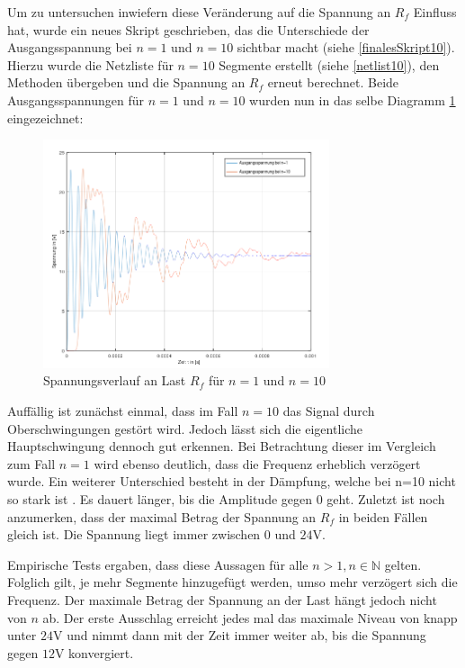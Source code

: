\newpage
Um zu untersuchen inwiefern diese Veränderung auf die Spannung an $R_f$ Einfluss hat, wurde ein neues Skript geschrieben, das die Unterschiede der Ausgangsspannung bei $n=1$ und $n=10$ sichtbar macht (siehe \ref{finalesSkript10}). Hierzu wurde die Netzliste für $n=10$ Segmente erstellt (siehe \ref{netlist10}), den Methoden übergeben und die Spannung an $R_f$ erneut berechnet.
Beide Ausgangsspannungen für $n=1$ und $n=10$ wurden nun in das selbe Diagramm \ref{plottKK10} eingezeichnet:

\begin{figure}[h]
	\centering
	\includegraphics[width=0.75\textwidth]{data/plotKK10}
	\caption{Spannungsverlauf an Last $R_f$ für $n=1$ und $n=10$}
	\label{plottKK10}
\end{figure}

Auffällig ist zunächst einmal, dass im Fall $n=10$ das Signal durch Oberschwingungen gestört wird. Jedoch lässt sich die eigentliche Hauptschwingung dennoch gut erkennen. Bei Betrachtung dieser im Vergleich zum Fall $n=1$ wird ebenso deutlich, dass die Frequenz erheblich verzögert wurde. Ein weiterer Unterschied besteht in der Dämpfung, welche bei n=10 nicht so stark ist . Es dauert länger, bis die Amplitude gegen $0$ geht. Zuletzt ist noch anzumerken, dass der maximal Betrag der Spannung an $R_f$ in beiden Fällen gleich ist. Die Spannung liegt immer zwischen $0$ und $24\si{\volt}$.

Empirische Tests ergaben, dass diese Aussagen für alle $n>1, n \in \mathbb{N}$ gelten. Folglich gilt, je mehr Segmente hinzugefügt werden, umso mehr verzögert sich die Frequenz. Der maximale Betrag der Spannung an der Last hängt jedoch nicht von $n$ ab. Der erste Ausschlag erreicht jedes mal das maximale Niveau von knapp unter $24\si{\volt}$ und nimmt dann mit der Zeit immer weiter ab, bis die Spannung gegen $12\si{\volt}$ konvergiert.